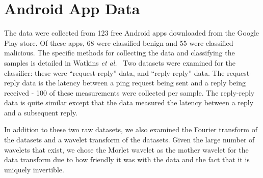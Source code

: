 \footnotesize
\renewcommand{\thechapter}{\Roman{chapter}}

\renewcommand{\thesection}{\Alph{section}.}

\chapter{Android App Data}
\label{append:one}

The data were collected from 123 free Android apps downloaded from the Google Play store. 
Of these apps, 68 were classified benign and 55 were classified malicious.
The specific methods for collecting the data and classifying the samples is detailed in Watkins \textit{et al.}~\cite{watkins2018network}
Two datasets were examined for the classifier: these were ``request-reply'' data, and ``reply-reply'' data.
The request-reply data is the latency between a ping request being sent and a reply being received - 100 of these measurements were collected per sample.
The reply-reply data is quite similar except that the data measured the latency between a reply and a subsequent reply.

In addition to these two raw datasets, we also examined the Fourier transform of the datasets and a wavelet transform of the datasets. 
Given the large number of wavelets that exist, we chose the Morlet wavelet as the mother wavelet for the data transform due to how friendly it was with the data and the fact that it is uniquely invertible.
